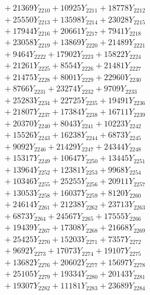 \documentclass[a4paper,10pt]{article}
\begin{document}
{\begin{align}
&\;  + 21369 Y_{2210} + 10925 Y_{2211} + 18778 Y_{2212} \\[0.3ex]
&\;  + 25550 Y_{2213} + 13598 Y_{2214} + 23028 Y_{2215} \\[0.3ex]
&\;  + 17944 Y_{2216} + 20661 Y_{2217} + 7941 Y_{2218} \\[0.5ex]\allowbreak
&\;  + 23058 Y_{2219} + 13869 Y_{2220} + 21489 Y_{2221} \\[0.3ex]
&\;  + 9464 Y_{2222} + 17902 Y_{2223} + 15822 Y_{2224} \\[0.3ex]
&\;  + 21261 Y_{2225} + 8554 Y_{2226} + 21481 Y_{2227} \\[0.3ex]
&\;  + 21475 Y_{2228} + 8001 Y_{2229} + 22960 Y_{2230} \\[0.3ex]
&\;  + 8766 Y_{2231} + 23274 Y_{2232} + 9709 Y_{2233} \\[0.3ex]
&\;  + 25283 Y_{2234} + 22725 Y_{2235} + 19491 Y_{2236} \\[0.3ex]
&\;  + 21807 Y_{2237} + 17384 Y_{2238} + 16711 Y_{2239} \\[0.3ex]
&\;  + 20370 Y_{2240} + 8043 Y_{2241} + 10223 Y_{2242} \\[0.3ex]
&\;  + 15526 Y_{2243} + 16238 Y_{2244} + 6873 Y_{2245} \\[0.3ex]
&\;  + 9092 Y_{2246} + 21429 Y_{2247} + 24344 Y_{2248} \\[0.5ex]\allowbreak
&\;  + 15317 Y_{2249} + 10647 Y_{2250} + 13445 Y_{2251} \\[0.3ex]
&\;  + 13964 Y_{2252} + 12381 Y_{2253} + 9968 Y_{2254} \\[0.3ex]
&\;  + 10346 Y_{2255} + 25255 Y_{2256} + 20911 Y_{2257} \\[0.3ex]
&\;  + 13053 Y_{2258} + 16037 Y_{2259} + 8120 Y_{2260} \\[0.3ex]
&\;  + 24614 Y_{2261} + 21238 Y_{2262} + 23713 Y_{2263} \\[0.3ex]
&\;  + 6873 Y_{2264} + 24567 Y_{2265} + 17555 Y_{2266} \\[0.3ex]
&\;  + 19439 Y_{2267} + 17308 Y_{2268} + 21668 Y_{2269} \\[0.3ex]
&\;  + 25425 Y_{2270} + 15203 Y_{2271} + 7357 Y_{2272} \\[0.3ex]
&\;  + 9692 Y_{2273} + 17073 Y_{2274} + 19107 Y_{2275} \\[0.3ex]
&\;  + 13682 Y_{2276} + 20602 Y_{2277} + 15697 Y_{2278} \\[0.5ex]\allowbreak
&\;  + 25105 Y_{2279} + 19334 Y_{2280} + 20143 Y_{2281} \\[0.3ex]
&\;  + 19307 Y_{2282} + 11181 Y_{2283} + 23689 Y_{2284} \\[0.3ex]

\end{align}}
\end{document}
